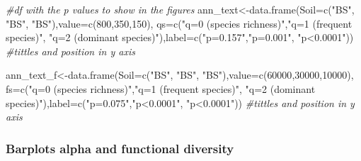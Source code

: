 \documentclass[]{interact}
\theoremstyle{plain}%
\theoremstyle{definition}
\theoremstyle{remark}
\newenvironment{Shaded}{\begin{snugshade}}{\end{snugshade}}
\newcommand{\AttributeTok}[1]{\textcolor[rgb]{0.77,0.63,0.00}{#1}}
\newcommand{\CommentTok}[1]{\textcolor[rgb]{0.56,0.35,0.01}{\textit{#1}}}
\newcommand{\DecValTok}[1]{\textcolor[rgb]{0.00,0.00,0.81}{#1}}
\newcommand{\FunctionTok}[1]{\textcolor[rgb]{0.00,0.00,0.00}{#1}}
\newcommand{\NormalTok}[1]{#1}
\newcommand{\OtherTok}[1]{\textcolor[rgb]{0.56,0.35,0.01}{#1}}
\newcommand{\StringTok}[1]{\textcolor[rgb]{0.31,0.60,0.02}{#1}}
\begin{document}
\begin{Shaded}
\begin{Highlighting}[]
\CommentTok{\#df with the p values to show in the figures}
\NormalTok{ann\_text}\OtherTok{\textless{}{-}}\FunctionTok{data.frame}\NormalTok{(}\AttributeTok{Soil=}\FunctionTok{c}\NormalTok{(}\StringTok{"BS"}\NormalTok{, }\StringTok{"BS"}\NormalTok{, }\StringTok{"BS"}\NormalTok{),}\AttributeTok{value=}\FunctionTok{c}\NormalTok{(}\DecValTok{800}\NormalTok{,}\DecValTok{350}\NormalTok{,}\DecValTok{150}\NormalTok{),}
\AttributeTok{qs=}\FunctionTok{c}\NormalTok{(}\StringTok{"q=0 (species richness)"}\NormalTok{,}\StringTok{"q=1 (frequent species)"}\NormalTok{,}
\StringTok{"q=2 (dominant species)"}\NormalTok{),}\AttributeTok{label=}\FunctionTok{c}\NormalTok{(}\StringTok{"p=0.157"}\NormalTok{,}\StringTok{"p=0.001"}\NormalTok{, }\StringTok{"p\textless{}0.0001"}\NormalTok{))}
\CommentTok{\#tittles and position in y axis}


\NormalTok{ann\_text\_f}\OtherTok{\textless{}{-}}\FunctionTok{data.frame}\NormalTok{(}\AttributeTok{Soil=}\FunctionTok{c}\NormalTok{(}\StringTok{"BS"}\NormalTok{, }\StringTok{"BS"}\NormalTok{, }\StringTok{"BS"}\NormalTok{),}\AttributeTok{value=}\FunctionTok{c}\NormalTok{(}\DecValTok{60000}\NormalTok{,}\DecValTok{30000}\NormalTok{,}\DecValTok{10000}\NormalTok{),}
\AttributeTok{fs=}\FunctionTok{c}\NormalTok{(}\StringTok{"q=0 (species richness)"}\NormalTok{,}\StringTok{"q=1 (frequent species)"}\NormalTok{,}
\StringTok{"q=2 (dominant species)"}\NormalTok{),}\AttributeTok{label=}\FunctionTok{c}\NormalTok{(}\StringTok{"p=0.075"}\NormalTok{,}\StringTok{"p\textless{}0.0001"}\NormalTok{, }\StringTok{"p\textless{}0.0001"}\NormalTok{)) }
\CommentTok{\#tittles and position in y axis}
\end{Highlighting}
\end{Shaded}

\hypertarget{barplots-alpha-and-functional-diversity}{%
\subsubsection{Barplots alpha and functional
diversity}\label{barplots-alpha-and-functional-diversity}}
\end{document}
